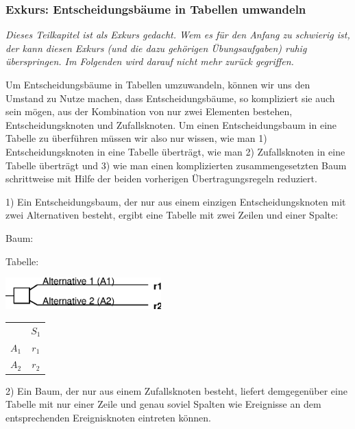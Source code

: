 \subsubsection{Exkurs: Entscheidungsbäume in Tabellen umwandeln}
\label{BaumTabelle}

{\em Dieses Teilkapitel ist als Exkurs gedacht. Wem es für den Anfang zu
schwierig ist, der kann diesen Exkurs (und die dazu gehörigen Übungsaufgaben) 
ruhig überspringen. Im Folgenden wird darauf nicht mehr zurück gegriffen.}

Um Entscheidungsbäume in Tabellen umzuwandeln, können wir uns den
Umstand zu Nutze machen, dass Entscheidungsbäume, so kompliziert sie
auch sein mögen, aus der Kombination von nur zwei Elementen bestehen,
Entscheidungsknoten und Zufallsknoten. Um einen Entscheidungsbaum in
eine Tabelle zu überführen müssen wir also nur wissen, wie man 1)
Entscheidungsknoten in eine Tabelle überträgt, wie man 2)
Zufallsknoten in eine Tabelle überträgt und 3) wie man einen
komplizierten zusammengesetzten Baum schrittweise mit Hilfe der beiden
vorherigen Übertragungsregeln reduziert.

1) Ein Entscheidungsbaum, der nur aus einem einzigen Ent\-scheidungs\-knoten mit
zwei Alternativen besteht, ergibt eine Tabelle mit zwei Zeilen und einer Spalte:

\vspace{0.5cm}

\parbox{7cm}{Baum:}\parbox{5cm}{Tabelle:}

\vspace{0.25cm}

\parbox{7cm}{\includegraphics[width=6cm]{Grafiken/Beispiel1b_1.eps}}
\parbox{5cm}{
\begin{tabular}{c|c|}
      & $S_1$ \\ \cline{1-2}
$A_1$ & $r_1$ \\ \cline{1-2}
$A_2$ & $r_2$ \\ \cline{1-2}
\end{tabular}}

\vspace{0.5cm}

2) Ein Baum, der nur aus einem Zufallsknoten besteht, liefert demgegenüber eine
Tabelle mit nur einer Zeile und genau soviel Spalten wie Ereignisse an dem
entsprechenden Ereignisknoten eintreten können.


